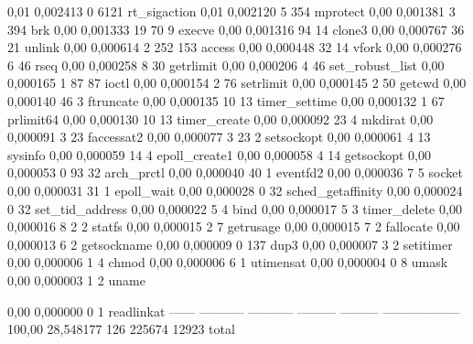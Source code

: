 \begin{myverbatim}
  0,01    0,002413           0      6121           rt_sigaction
  0,01    0,002120           5       354           mprotect
  0,00    0,001381           3       394           brk
  0,00    0,001333          19        70         9 execve
  0,00    0,001316          94        14           clone3
  0,00    0,000767          36        21           unlink
  0,00    0,000614           2       252       153 access
  0,00    0,000448          32        14           vfork
  0,00    0,000276           6        46           rseq
  0,00    0,000258           8        30           getrlimit
  0,00    0,000206           4        46           set_robust_list
  0,00    0,000165           1        87        87 ioctl
  0,00    0,000154           2        76           setrlimit
  0,00    0,000145           2        50           getcwd
  0,00    0,000140          46         3           ftruncate
  0,00    0,000135          10        13           timer_settime
  0,00    0,000132           1        67           prlimit64
  0,00    0,000130          10        13           timer_create
  0,00    0,000092          23         4           mkdirat
  0,00    0,000091           3        23           faccessat2
  0,00    0,000077           3        23         2 setsockopt
  0,00    0,000061           4        13           sysinfo
  0,00    0,000059          14         4           epoll_create1
  0,00    0,000058           4        14           getsockopt
  0,00    0,000053           0        93        32 arch_prctl
  0,00    0,000040          40         1           eventfd2
  0,00    0,000036           7         5           socket
  0,00    0,000031          31         1           epoll_wait
  0,00    0,000028           0        32           sched_getaffinity
  0,00    0,000024           0        32           set_tid_address
  0,00    0,000022           5         4           bind
  0,00    0,000017           5         3           timer_delete
  0,00    0,000016           8         2         2 statfs
  0,00    0,000015           2         7           getrusage
  0,00    0,000015           7         2           fallocate
  0,00    0,000013           6         2           getsockname
  0,00    0,000009           0       137           dup3
  0,00    0,000007           3         2           setitimer
  0,00    0,000006           1         4           chmod
  0,00    0,000006           6         1           utimensat
  0,00    0,000004           0         8           umask
  0,00    0,000003           1         2           uname
\end{myverbatim}
\newpage
\begin{myverbatim}
  0,00    0,000000           0         1           readlinkat
------ ----------- ----------- --------- --------- ------------------
100,00   28,548177         126    225674     12923 total
\end{myverbatim}